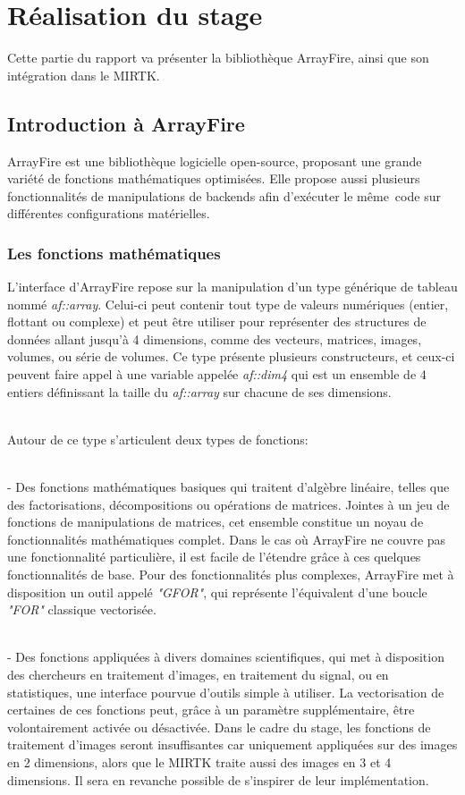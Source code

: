 \documentclass[10pt]{report}
\begin{document}
\chapter{Réalisation du stage} 

Cette partie du rapport va présenter la bibliothèque ArrayFire, ainsi que son intégration dans le MIRTK.
	\section{Introduction à ArrayFire}
	ArrayFire est une bibliothèque logicielle open-source, proposant une grande variété de fonctions mathématiques optimisées. Elle propose aussi plusieurs fonctionnalités de manipulations de backends afin d'exécuter le même code sur différentes configurations matérielles.
	\subsection{Les fonctions mathématiques}
	L'interface d'ArrayFire repose sur la manipulation d'un type générique de tableau nommé \textit{af::array}. Celui-ci peut contenir tout type de valeurs numériques (entier, flottant ou complexe) et peut être utiliser pour représenter des structures de données allant jusqu'à 4 dimensions, comme des vecteurs, matrices, images, volumes, ou série de volumes. Ce type présente plusieurs constructeurs, et ceux-ci peuvent faire appel à une variable appelée \textit{af::dim4} qui est un ensemble de 4 entiers définissant la taille du \textit{af::array} sur chacune de ses dimensions.\\ ~\par 
	
	\noindent Autour de ce type s'articulent deux types de fonctions:\\ ~\par 
	- Des fonctions mathématiques basiques qui traitent d'algèbre linéaire, telles que des factorisations, décompositions ou opérations de matrices. Jointes à un jeu de fonctions de manipulations de matrices, cet ensemble constitue un noyau de fonctionnalités mathématiques complet. Dans le cas où ArrayFire ne couvre pas une fonctionnalité particulière, il est facile de l'étendre grâce à ces quelques fonctionnalités de base. Pour des fonctionnalités plus complexes, ArrayFire met à disposition un outil appelé \textit{"GFOR"}, qui représente l'équivalent d'une boucle \textit{"FOR"} classique vectorisée. \\~\par 
	- Des fonctions appliquées à divers domaines scientifiques, qui met à disposition des chercheurs en traitement d'images, en traitement du signal, ou en statistiques, une interface pourvue d'outils simple à utiliser. La vectorisation de certaines de ces fonctions peut, grâce à un paramètre supplémentaire, être volontairement activée ou désactivée. Dans le cadre du stage, les fonctions de traitement d'images seront insuffisantes car uniquement appliquées sur des images en 2 dimensions, alors que le MIRTK traite aussi des images en 3 et 4 dimensions. Il sera en revanche possible de s'inspirer de leur implémentation.\\
	
\end{document}
